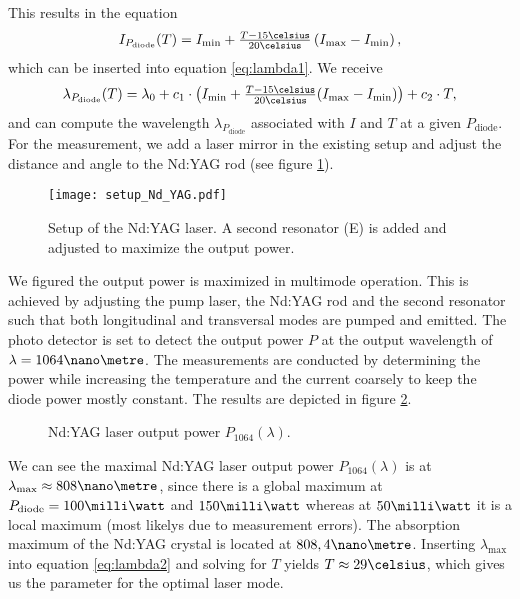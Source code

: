 This results in the equation
\begin{align}
I_{P_\text{diode}}(T)=I_\text{min}+\tfrac{T-15\celsius}{20\celsius}\left(I_\text{max}-I_\text{min}\right),
\label{eq:current_P}
\end{align}
which can be inserted into equation \eqref{eq:lambda1}. We receive
\begin{align}
\lambda_{P_\text{diode}}(T)=\lambda_0+c_1\cdot \left(I_\text{min}+\tfrac{T-15\celsius}{20\celsius}(I_\text{max}-I_\text{min})\right)+c_2\cdot T,
\label{eq:lambda2}
\end{align}
and can compute the wavelength $\lambda_{P_\text{diode}}$ associated with $I$ and $T$ at a given $P_\text{diode}$.
For the measurement, we add a laser mirror in the existing setup and adjust the distance and angle to the Nd:YAG rod (see figure \ref{fig:setup_Nd:YAG}).

\begin{figure}[h]
	\centering
	\texttt{[image: setup\_Nd\_YAG.pdf]}
	\caption[Setup of the Nd:YAG laser]{Setup of the Nd:YAG laser. A second resonator (E) is added and adjusted to maximize the output power. \cite{lit:manual}}
	\label{fig:setup_Nd:YAG}
\end{figure}

We figured the output power is maximized in multimode operation. This is achieved by adjusting the pump laser, the Nd:YAG rod and the second resonator such that both longitudinal and transversal modes are pumped and emitted.
The photo detector is set to detect the output power $P$ at the output wavelength of $\lambda=1064\nano\metre$. The measurements are conducted by determining the power while increasing the temperature and the current coarsely to keep the diode power mostly constant.
The results are depicted in figure \ref{fig:lambda2}.

\begin{figure}[h]
	\centering
	
	\caption{Nd:YAG laser output power $P_{1064}(\lambda)$.}
	\label{fig:lambda2}
\end{figure}

We can see the maximal Nd:YAG laser output power $P_{1064}(\lambda)$ is at $\lambda_\text{max}\approx 808\nano\metre$, since there is a global maximum at $P_\text{diode}=100\milli\watt$ and $150\milli\watt$ whereas at $50\milli\watt$ it is a local maximum (most likelys due to measurement errors).
The absorption maximum of the Nd:YAG crystal is located at $808,4\nano\metre$. Inserting $\lambda_\text{max}$ into equation \eqref{eq:lambda2} and solving for $T$ yields $T\approx 29\celsius$, which gives us the parameter for the optimal laser mode.

